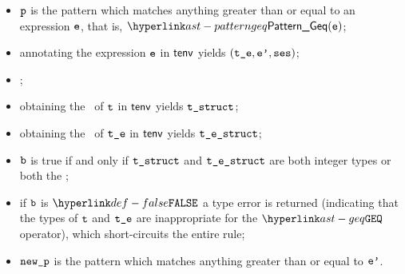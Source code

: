\ProseParagraph
\AllApply
\begin{itemize}
\item $\vp$ is the pattern which matches anything greater than or equal to an expression $\ve$,
      that is, $\PatternGeq(\ve)$;
\item annotating the expression $\ve$ in $\tenv$ yields $(\vte, \vep, \vses)$\ProseOrTypeError;
\item \Prosechecksymbolicallyevaluable{$\vses$};
\item obtaining the \underlyingtype\ of $\vt$ in $\tenv$ yields $\vtstruct$\ProseOrTypeError;
\item obtaining the \underlyingtype\ of $\vte$ in $\tenv$ yields $\testruct$\ProseOrTypeError;
\item $\vb$ is true if and only if $\vtstruct$ and $\testruct$ are both integer types or both the \realtypeterm{};
\item if $\vb$ is $\False$ a type error is returned (indicating that the types of $\vt$ and $\vte$
      are inappropriate for the $\GEQ$ operator),
      which short-circuits the entire rule;
\item $\newp$ is the pattern which matches anything greater than or equal to $\vep$.
\end{itemize}
\FormallyParagraph
\begin{mathpar}
\end{mathpar}

